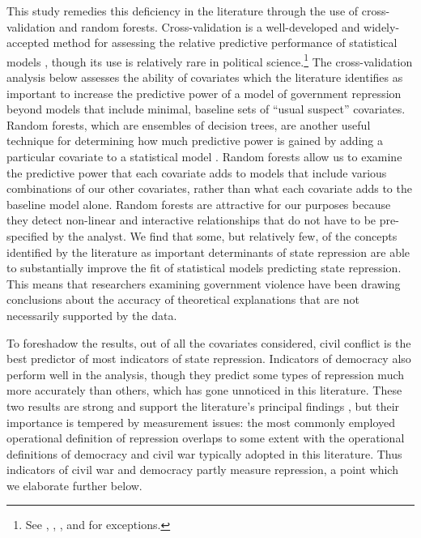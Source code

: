 \documentclass[11pt]{article}
\begin{document}
This study remedies this deficiency in the literature through the use of cross-validation and random forests. Cross-validation is a well-developed and widely-accepted method for assessing the relative predictive performance of statistical models \citep[See, e.g.,][]{Geisser1975, Efron1983, PicardCook1984, HastieTibshiraniFriedman2008}, though its use is relatively rare in political science.\footnote{See \citet{HoffWard2004}, \citet{WardHoff2007}, \citet{WardSiversonCao2007}, and \citet{Wardetal2010} for exceptions.} The cross-validation analysis below assesses the ability of covariates which the literature identifies as important to increase the predictive power of a model of government repression beyond models that include minimal, baseline sets of ``usual suspect'' covariates. Random forests, which are ensembles of decision trees, are another useful technique for determining how much predictive power is gained by adding a particular covariate to a statistical model \citep{breiman2001random}. Random forests allow us to examine the predictive power that each covariate adds to models that include various combinations of our other covariates, rather than what each covariate adds to the baseline model alone. Random forests are attractive for our purposes because they detect non-linear and interactive relationships that do not have to be pre-specified by the analyst. We find that some, but relatively few, of the concepts identified by the literature as important determinants of state repression are able to substantially improve the fit of statistical models predicting state repression. This means that researchers examining government violence have been drawing conclusions about the accuracy of theoretical explanations that are not necessarily supported by the data. 

To foreshadow the results, out of all the covariates considered, civil conflict is the best predictor of most indicators of state repression. Indicators of democracy also perform well in the analysis, though they predict some types of repression much more accurately than others, which has gone unnoticed in this literature. These two results are strong and support the literature's principal findings \citep[See][pp.\ 7-14]{Davenport2007AR}, but their importance is tempered by measurement issues: the most commonly employed operational definition of repression overlaps to some extent with the operational definitions of democracy and civil war typically adopted in this literature. Thus indicators of civil war and democracy partly measure repression, a point which we elaborate further below. 
\end{document}
